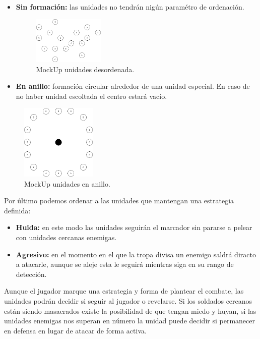 \begin{itemize}
\item \textbf{Sin formación:} las unidades no tendrán nigún paramétro de ordenación.

\begin{figure}[ht]
\centering
\includegraphics[width=0.32\textwidth]{imagenes/gdd/Formacion-desordenada.png}
\caption{MockUp unidades desordenada.}
\label{mockup_desordenada}
\end{figure}

\item \textbf{En anillo:} formación circular alrededor de una unidad especial. En caso de
no haber unidad escoltada el centro estará vacío. 
\end{itemize} 


\begin{figure}[ht]
\centering
\includegraphics[width=0.32\textwidth]{imagenes/gdd/Formacion-anillo.png}
\caption{MockUp unidades en anillo.}
\label{mockup_anillo}
\end{figure}

Por último podemos ordenar a las unidades que mantengan una estrategia definida:

\begin{itemize}
\item \textbf{Huida:} en este modo las unidades seguirán el marcador sin pararse a pelear con unidades
cercanas enemigas.

\item \textbf{Agresivo:} en el momento en el que la tropa divisa un enemigo saldrá diracto a atacarle,
aunque se aleje esta le seguirá mientras siga en su rango de detección.
\end{itemize} 

Aunque el jugador marque una estrategia y forma de plantear el combate, las unidades podrán
decidir si seguir al jugador o revelarse. Si los soldados cercanos están siendo masacrados
existe la posibilidad de que tengan miedo y huyan, si las unidades enemigas nos superan en número
la unidad puede decidir si permanecer en defensa en lugar de atacar de forma activa.

